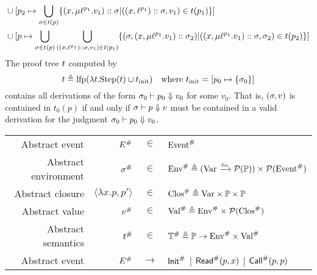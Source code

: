 \documentclass{article}
\begin{document}
\begin{align*}
	\cup                       & \: [p_2\mapsto\bigcup_{\sigma\in t(p)}\{(x,\mu{\ell}^{p_1}.v_1)::\sigma|((x,{\ell}^{p_1})::\sigma,v_1)\in t(p_1)\}]                                                                                                                                                   \\
	\cup                       & \: [p\mapsto\bigcup_{\sigma\in t(p)}\bigcup_{((x,{\ell}^{p_1})::\sigma,v_1)\in t(p_1)}\{(\sigma,(x,\mu{\ell}^{p_1}.v_1)::\sigma_2)|((x,\mu{\ell}^{p_1}.v_1)::\sigma,\sigma_2)\in t(p_2)\}]
\end{align*}
The proof tree $t$ computed by
\[t\triangleq\text{lfp}(\lambda t.\text{Step}(t)\cup t_{\text{init}})\quad\text{where }t_{\text{init}}=[p_0\mapsto\{\sigma_0\}]\]
contains all derivations of the form ${\sigma_0}\vdash{p_0}\Downarrow{v_0}$ for some $v_0$.
That is, $(\sigma,v)$ is contained in $t_0(p)$ if and only if ${\sigma}\vdash{p}\Downarrow{v}$ must be contained in a valid derivation for the judgment ${\sigma_0}\vdash{p_0}\Downarrow{v_0}$.
\begin{center}
	\begin{tabular}{rrcl}
		Abstract event       & ${E}^{\#}$                 & $\in$         & ${\text{Event}}^{\#}$                                                                     \\
		Abstract environment & ${\sigma}^{\#}$                   & $\in$         & ${\text{Env}}^{\#}\triangleq({\text{Var}}\xrightarrow{\mbox{\tiny{fin}}}{\mathcal{P}(\mathbb{P})})\times\mathcal{P}({\text{Event}}^{\#})$ \\
		Abstract closure     & $\langle\lambda x.p,p'\rangle$ & $\in$         & ${\text{Clos}}^{\#}\triangleq\text{Var}\times\mathbb{P}\times\mathbb{P}$              \\
		Abstract value       & ${v}^{\#}$                      & $\in$         & ${\text{Val}}^{\#}\triangleq{\text{Env}}^{\#}\times\mathcal{P}({\text{Clos}}^{\#})$                   \\
		Abstract semantics   & ${t}^{\#}$                   & $\in$         & ${\mathbb{T}}^{\#}\triangleq\mathbb{P}\rightarrow{\text{Env}}^{\#}\times{\text{Val}}^{\#}$      \\
		Abstract event       & ${E}^{\#}$                 & $\rightarrow$ & ${\textsf{Init}}^{\#}$ | ${\textsf{Read}}^{\#}(p,x)$ | ${\textsf{Call}}^{\#}(p,p)$
	\end{tabular}
\end{center}
\end{document}
